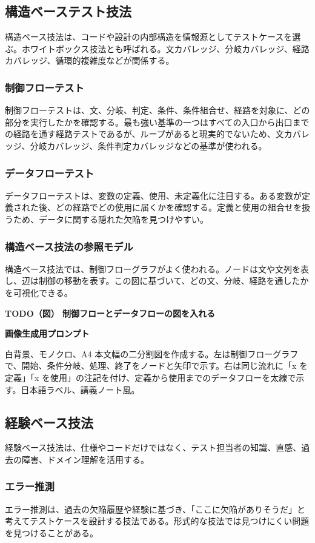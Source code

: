 \documentclass[uplatex,dvipdfmx,a4paper,11pt,nomag]{jsarticle}
\newenvironment{todobox}[2]{\par\medskip\begin{framed}\noindent\textbf{TODO（図） #1}\par\smallskip\noindent\textbf{画像生成用プロンプト}\par\smallskip\noindent #2\par\smallskip}{\end{framed}\par\medskip}
\begin{document}
\subsection{構造ベーステスト技法}
構造ベース技法は、コードや設計の内部構造を情報源としてテストケースを選ぶ。ホワイトボックス技法とも呼ばれる。文カバレッジ、分岐カバレッジ、経路カバレッジ、循環的複雑度などが関係する。

\subsubsection{制御フローテスト}
制御フローテストは、文、分岐、判定、条件、条件組合せ、経路を対象に、どの部分を実行したかを確認する。最も強い基準の一つはすべての入口から出口までの経路を通す経路テストであるが、ループがあると現実的でないため、文カバレッジ、分岐カバレッジ、条件判定カバレッジなどの基準が使われる。

\subsubsection{データフローテスト}
データフローテストは、変数の定義、使用、未定義化に注目する。ある変数が定義された後、どの経路でどの使用に届くかを確認する。定義と使用の組合せを扱うため、データに関する隠れた欠陥を見つけやすい。

\subsubsection{構造ベース技法の参照モデル}
構造ベース技法では、制御フローグラフがよく使われる。ノードは文や文列を表し、辺は制御の移動を表す。この図に基づいて、どの文、分岐、経路を通したかを可視化できる。

\begin{todobox}{制御フローとデータフローの図を入れる}{白背景、モノクロ、A4 本文幅の二分割図を作成する。左は制御フローグラフで、開始、条件分岐、処理、終了をノードと矢印で示す。右は同じ流れに「x を定義」「x を使用」の注記を付け、定義から使用までのデータフローを太線で示す。日本語ラベル、講義ノート風。}
\end{todobox}

\subsection{経験ベース技法}
経験ベース技法は、仕様やコードだけではなく、テスト担当者の知識、直感、過去の障害、ドメイン理解を活用する。

\subsubsection{エラー推測}
エラー推測は、過去の欠陥履歴や経験に基づき、「ここに欠陥がありそうだ」と考えてテストケースを設計する技法である。形式的な技法では見つけにくい問題を見つけることがある。
\end{document}

